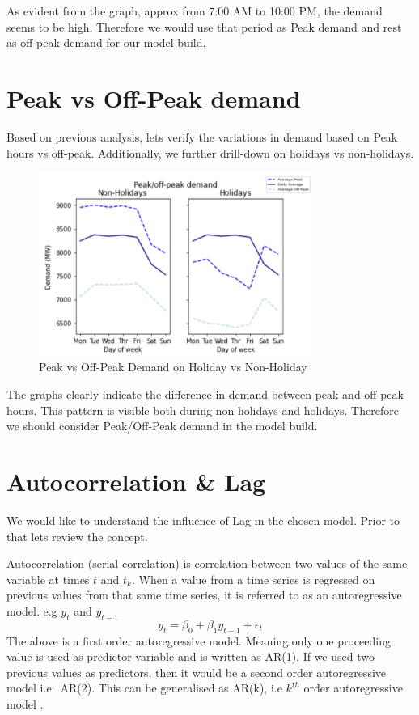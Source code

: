\documentclass[mstat,12pt]{unswthesis}
\begin{document}
As evident from the graph, approx from 7:00 AM to 10:00 PM, the demand
seems to be high. Therefore we would use that period as Peak demand and
rest as off-peak demand for our model build.

\section{Peak vs Off-Peak demand}\label{peak-vs-off-peak-demand}

Based on previous analysis, lets verify the variations in demand based
on Peak hours vs off-peak. Additionally, we further drill-down on
holidays vs non-holidays.

\begin{figure}[H]
\centering
\includegraphics[width=0.80\textwidth,height=6cm]{holiday_nonholiday.png}
\caption{Peak vs Off-Peak Demand on Holiday vs Non-Holiday}
\label{holiday_nonholiday}
\end{figure}

The graphs clearly indicate the difference in demand between peak and
off-peak hours. This pattern is visible both during non-holidays and
holidays. Therefore we should consider Peak/Off-Peak demand in the model
build.

\section{Autocorrelation \& Lag}\label{autocorrelation-lag}

We would like to understand the influence of Lag in the chosen model.
Prior to that lets review the concept.

Autocorrelation (serial correlation) is correlation between two values
of the same variable at times \(t\) and \(t_k\). When a value from a
time series is regressed on previous values from that same time series,
it is referred to as an autoregressive model. e.g \(y_t\) and
\(y_{t-1}\) \[ 
y_t = \beta_0 + \beta_1 y_{t-1} + \epsilon_t
\] The above is a first order autoregressive model. Meaning only one
proceeding value is used as predictor variable and is written as AR(1).
If we used two previous values as predictors, then it would be a second
order autoregressive model i.e.~AR(2). This can be generalised as AR(k),
i.e \(k^{th}\) order autoregressive model
\cite{thepennsylvaniastateuniversity_102}.
\end{document}
